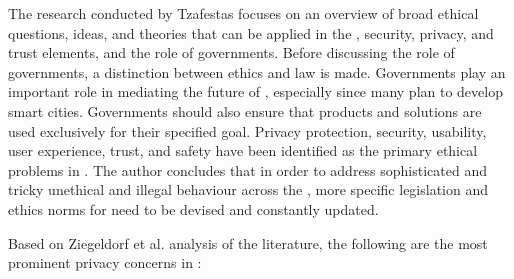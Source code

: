 The research conducted by Tzafestas \cite{tzafestas2018ethics} focuses on
an overview of broad ethical questions, ideas, and theories that can be
applied in the \hyperlink{\acronym}{\acronym}, \hyperlink{\acronym}{\acronym} security, privacy, and trust elements, and the role
of governments. Before discussing the role of governments, a distinction
between ethics and law is made. Governments play an important role in mediating
the future of \hyperlink{\acronym}{\acronym}, especially since many plan to develop smart cities.
Governments should also ensure that \hyperlink{\acronym}{\acronym} products and solutions are used
exclusively for their specified goal. Privacy protection, security, usability,
user experience, trust, and safety have been identified as the primary
ethical problems in \hyperlink{\acronym}{\acronym}. The author concludes that in order to address
sophisticated and tricky unethical and illegal behaviour across the \hyperlink{\acronym}{\acronym},
more specific \hyperlink{\acronym}{\acronym} legislation and ethics norms for \hyperlink{\acronym}{\acronym} need to be devised
and constantly updated.

Based on Ziegeldorf et al. \cite{ziegeldorf2014privacy} analysis of the literature,
the following are the most prominent privacy concerns in \hyperlink{\acronym}{\acronym}:

